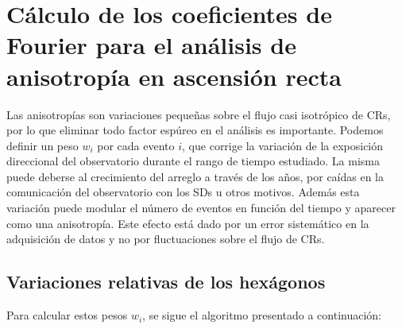 
\section{Cálculo de los coeficientes de Fourier para el análisis de anisotropía en ascensión recta}

Las anisotropías son variaciones pequeñas sobre el flujo casi isotrópico de CRs, por lo que eliminar todo factor espúreo en el análisis es importante.  Podemos definir un peso  $w_i$ por cada evento $i$, que corrige la variación de la exposición direccional del observatorio durante el rango de tiempo estudiado. La misma puede deberse al crecimiento del arreglo a través de los años,  por caídas en la comunicación del observatorio con los SDs u otros motivos. Además esta variación puede modular el número de  eventos en función del tiempo y aparecer como una anisotropía. Este efecto está dado por un error sistemático en la adquisición de datos y no por fluctuaciones sobre el flujo de CRs.

  \subsection{Variaciones relativas de los hexágonos} \label{peso_hexagonos}


    Para calcular estos pesos $w_i$, se sigue el algoritmo presentado a continuación:
     
